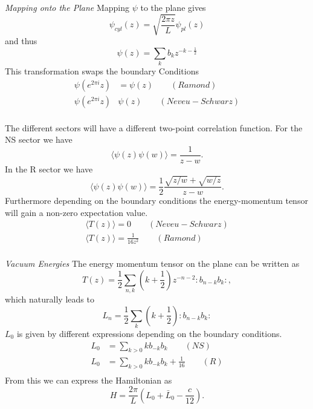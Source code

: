 \documentclass[submission, PhysLectNotes]{SciPost}
\begin{document}
{\it Mapping onto the Plane}
Mapping $\psi$ to the plane gives
\begin{equation}
  \psi_{cyl}(z) = \sqrt{\frac{2\pi z}{L}}\psi_{pl}(z)
\end{equation}
and thus
\begin{equation}
  \psi(z) = \sum_k b_k z^{-k-\frac{1}{2}}
\end{equation}
This transformation swaps the boundary Conditions
\begin{align}
  \psi(e^{2\pi i}z) &=\psi(z) \qquad(Ramond)\\
  \psi(e^{2\pi i}z) &\psi(z) \qquad(Neveu-Schwarz)\\
\end{align}

The different sectors will have a different two-point correlation function. For the NS sector we have
\begin{equation}
  \langle\psi(z)\psi(w)\rangle = \frac{1}{z-w}.
\end{equation}
In the R sector we have
\begin{equation}
  \langle\psi(z)\psi(w)\rangle = \frac{1}{2}\frac{\sqrt{z/w}+\sqrt{w/z}}{z-w}.
\end{equation}
Furthermore depending on the boundary conditions the energy-momentum tensor will gain a non-zero expectation value.
\begin{align}
  \langle T(z)\rangle = 0 \qquad(Neveu-Schwarz)\\
  \langle T(z)\rangle = \frac{1}{16z^2} \qquad(Ramond)\\
\end{align}


{\it Vacuum Energies}
The energy momentum tensor on the plane can be written as
\begin{equation}
  T(z) = \frac{1}{2}\sum_{n,k}(k+\frac{1}{2})z^{-n-2}:b_{n-k}b_k:,
\end{equation}
which naturally leads to
\begin{equation}
  L_n = \frac{1}{2}\sum_k(k+\frac{1}{2}):b_{n-k}b_{k}:
\end{equation}
$L_0$ is given by different expressions depending on the boundary conditions.
\begin{align}
  L_0 &= \sum_{k>0}kb_{-k}b_k \qquad (NS)\\
  L_0 &= \sum_{k>0}kb_{-k}b_k + \frac{1}{16} \qquad (R)\\
\end{align}
From this we can express the Hamiltonian as
\begin{equation}
  H = \frac{2\pi}{L}(L_0 + \bar{L}_0-\frac{c}{12}).
\end{equation}
\end{document}
